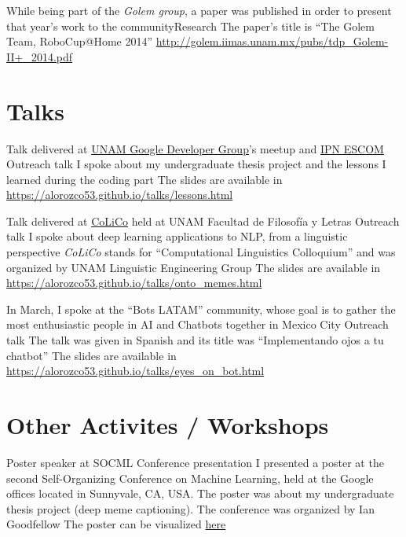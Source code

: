 \documentclass[11pt,a4paper,sans]{moderncv} %
\begin{document}
        {While being part of the \emph{Golem group}, a paper was published in order to present that year's work to the community}{Research}
        {The paper's title is ``The Golem Team, RoboCup@Home 2014''}{}
        {\url{http://golem.iimas.unam.mx/pubs/tdp_Golem-II+_2014.pdf}}

\section{Talks}

        {Talk delivered at \href{https://www.meetup.com/GDG-UNAM/}{UNAM Google Developer Group}'s meetup and \href{http://www.escom.ipn.mx}{IPN ESCOM}}
        {Outreach talk}
        {I spoke about my undergraduate thesis project and the lessons I learned during the coding part}{}
        {The slides are available in \url{https://alorozco53.github.io/talks/lessons.html}}

        {Talk delivered at \href{http://www.corpus.unam.mx/colico/VIIICoLiCo.html}{CoLiCo} held at UNAM Facultad de Filosofía y Letras}
        {Outreach talk}
        {I spoke about deep learning applications to NLP, from a linguistic perspective}
        {\emph{CoLiCo} stands for ``Computational Linguistics Colloquium'' and was organized by UNAM Linguistic Engineering Group}
        {The slides are available in \url{https://alorozco53.github.io/talks/onto_memes.html}}

        {In March, I spoke at the ``Bots LATAM'' community, whose goal is to gather the most enthusiastic people in AI and Chatbots together in Mexico City}
        {Outreach talk}
        {The talk was given in Spanish and its title was ``Implementando ojos a tu chatbot''}{}
        {The slides are available in \url{https://alorozco53.github.io/talks/eyes_on_bot.html}}

\section{Other Activites / Workshops}

        {Poster speaker at SOCML}
        {Conference presentation}
        {I presented a poster at the second Self-Organizing Conference on Machine Learning, held at the Google offices located in Sunnyvale, CA, USA. The poster was about my undergraduate thesis project (deep meme captioning). The conference was organized by Ian Goodfellow}
        {The poster can be visualized \href{https://drive.google.com/file/d/1DPjqiXcmliwPZBOfBIXxnIX_rs9EPUub/view?usp=sharing}{here}}
        {}
\end{document}
